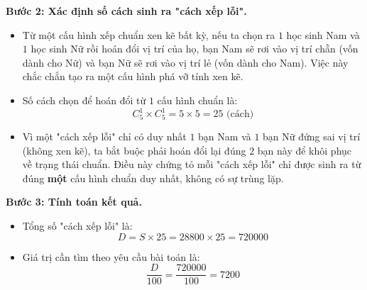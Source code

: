 \documentclass[12pt,a4paper]{article}
\begin{document}
\begin{ex}
{\begin{apdungbox}
\textbf{Bước 2: Xác định số cách sinh ra "cách xếp lỗi".}
\begin{itemize}
    \item Từ một cấu hình xếp chuẩn xen kẽ bất kỳ, nếu ta chọn ra $1$ học sinh Nam và $1$ học sinh Nữ rồi hoán đổi vị trí của họ, bạn Nam sẽ rơi vào vị trí chẵn (vốn dành cho Nữ) và bạn Nữ sẽ rơi vào vị trí lẻ (vốn dành cho Nam). Việc này chắc chắn tạo ra một cấu hình phá vỡ tính xen kẽ.
    \item Số cách chọn để hoán đổi từ $1$ cấu hình chuẩn là:
    \[ C_5^1 \times C_5^1 = 5 \times 5 = 25 \text{ (cách)} \]
    \item Vì một "cách xếp lỗi" chỉ có duy nhất $1$ bạn Nam và $1$ bạn Nữ đứng sai vị trí (không xen kẽ), ta bắt buộc phải hoán đổi lại đúng $2$ bạn này để khôi phục về trạng thái chuẩn. Điều này chứng tỏ mỗi "cách xếp lỗi" chỉ được sinh ra từ đúng \textbf{một} cấu hình chuẩn duy nhất, không có sự trùng lặp.
\end{itemize}

\textbf{Bước 3: Tính toán kết quả.}
\begin{itemize}
    \item Tổng số "cách xếp lỗi" là: 
    \[ D = S \times 25 = 28800 \times 25 = 720000 \]
    \item Giá trị cần tìm theo yêu cầu bài toán là: 
    \[ \dfrac{D}{100} = \dfrac{720000}{100} = 7200 \]
\end{itemize}
\end{apdungbox}
}
\end{ex}
\end{document}
